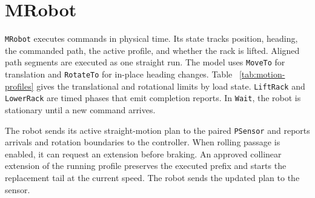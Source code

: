\documentclass[11pt,a4paper]{article}
\begin{document}
\section{MRobot}
\label{app:mrobot}
\texttt{MRobot} executes commands in physical time. Its state tracks
position, heading, the commanded path, the active profile, and
whether the rack is lifted. Aligned path segments are executed as
one straight run. The model uses \texttt{MoveTo} for translation
and \texttt{RotateTo} for in-place heading changes. Table%
~\ref{tab:motion-profiles} gives the translational and rotational
limits by load state. \texttt{LiftRack} and \texttt{LowerRack} are
timed phases that emit completion reports. In \texttt{Wait}, the
robot is stationary until a new command arrives.

The robot sends its active straight-motion plan to the paired
\texttt{PSensor} and reports arrivals and rotation boundaries to
the controller. When rolling passage is enabled, it can request an
extension before braking. An approved collinear extension of the
running profile preserves the executed prefix and starts the
replacement tail at the current speed. The robot sends the updated
plan to the sensor.
\end{document}
